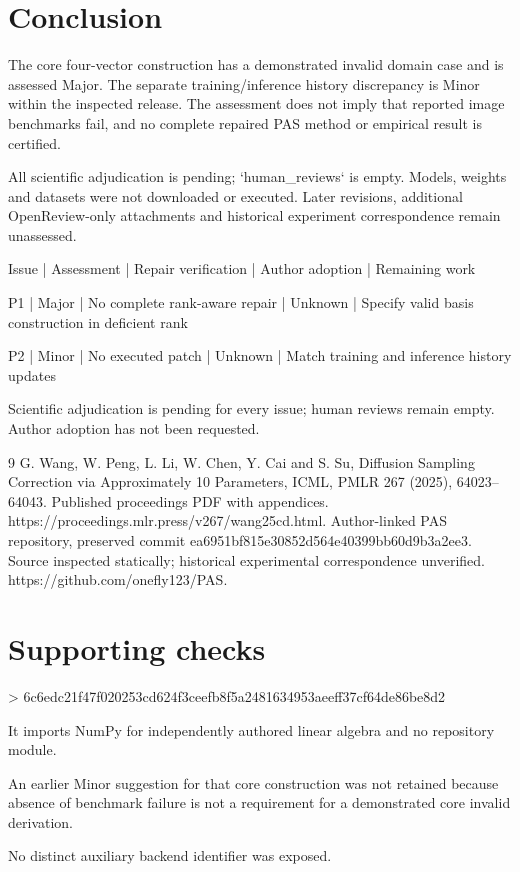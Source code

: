 \documentclass[10pt]{article}
\begin{document}
\section*{Conclusion}
The core four-vector construction has a demonstrated invalid domain case and is assessed Major. The separate training/inference history discrepancy is Minor within the inspected release. The assessment does not imply that reported image benchmarks fail, and no complete repaired PAS method or empirical result is certified.\par
All scientific adjudication is pending; `human\_reviews` is empty. Models, weights and datasets were not downloaded or executed. Later revisions, additional OpenReview-only attachments and historical experiment correspondence remain unassessed.\par
Issue | Assessment | Repair verification | Author adoption | Remaining work\par
P1 | Major | No complete rank-aware repair | Unknown | Specify valid basis construction in deficient rank\par
P2 | Minor | No executed patch | Unknown | Match training and inference history updates\par
Scientific adjudication is pending for every issue; human reviews remain empty. Author adoption has not been requested.\par
9 G. Wang, W. Peng, L. Li, W. Chen, Y. Cai and S. Su, Diffusion Sampling Correction via Approximately 10 Parameters, ICML, PMLR 267 (2025), 64023–64043. Published proceedings PDF with appendices. https://proceedings.mlr.press/v267/wang25cd.html. Author-linked PAS repository, preserved commit ea6951bf815e30852d564e40399bb60d9b3a2ee3. Source inspected statically; historical experimental correspondence unverified. https://github.com/onefly123/PAS.\par
\section*{Supporting checks}
> 6c6edc21f47f020253cd624f3ceefb8f5a2481634953aeeff37cf64de86be8d2\par
It imports NumPy for independently authored linear algebra and no repository module.\par
An earlier Minor suggestion for that core construction was not retained because absence of benchmark failure is not a requirement for a demonstrated core invalid derivation.\par
No distinct auxiliary backend identifier was exposed.\par
\end{document}
